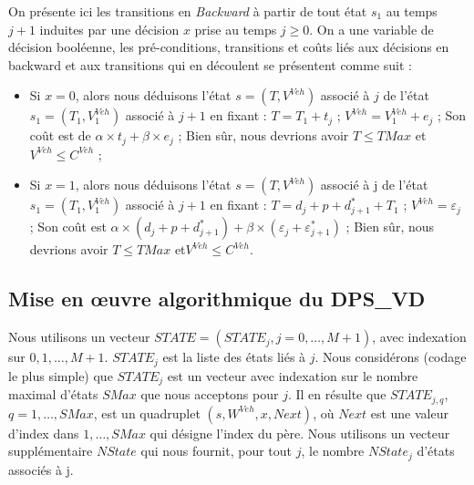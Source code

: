 On présente ici les transitions en \textit{Backward} à partir de tout état $s_1$ au temps $j+1$ induites par une décision $x$ prise au temps $j \geq 0$.
On a une variable de décision booléenne, les pré-conditions, transitions et coûts liés aux décisions en backward et aux transitions qui en découlent se présentent comme suit :
\begin{itemize}[label=$\square$]
	
	\item Si $x = 0$, alors nous déduisons l'état $s = (T, V^{Veh})$ associé à $j$ de l'état $s_1 = (T_1, V^{Veh}_1)$ associé à $j+1$ en fixant : $T = T_1 + t_j$ ; $V^{Veh} = V^{Veh}_1 + e_j$ ; Son coût est de $\alpha \times t_j + \beta \times e_j$ ; Bien sûr, nous devrions avoir $T \leq TMax$ et $V^{Veh} \leq C^{Veh}$ ;
	\item Si $x = 1$, alors nous déduisons l'état $s = (T, V^{Veh})$ associé à j de l'état $s_1 = (T_1, V^{Veh}_1)$ associé à $j+1$ en fixant : $T = d_j + p + d^*_{j+1} + T_1$ ;  $V^{Veh} = \varepsilon_j$ ; Son coût est $\alpha \times (d_j + p + d^*_{j+1}) + \beta \times (\varepsilon_j + \varepsilon^*_{j+1})$ ; Bien sûr, nous devrions avoir $T \leq TMax$ et$ V^{Veh} \leq C^{Veh}$.
	
\end{itemize}

 

\subsection{Mise en œuvre algorithmique du DPS\_VD}
Nous utilisons un vecteur $STATE= (STATE_j, j=0, \dots,M+1)$, avec indexation sur $0,1, \dots,M+1$. $STATE_j$ est la liste des états liés à $j$. Nous considérons (codage le plus simple) que $STATE_j$ est un vecteur avec indexation sur le nombre maximal d'états $SMax$ que nous acceptons pour $j$. Il en résulte que $STATE_{j, q}$, $q = 1, \dots,SMax$, est un quadruplet $(s, W^{Veh}, x, Next)$, où $Next$ est une valeur d'index dans $1, \dots,SMax$ qui désigne l'index du père. Nous utilisons un vecteur supplémentaire $NState$ qui nous fournit, pour tout $j$, le nombre $NState_j$ d'états associés à j. 


